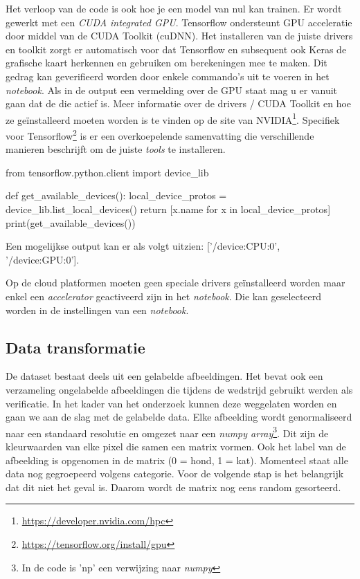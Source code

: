 Het verloop van de code is ook hoe je een model van nul kan trainen. Er wordt gewerkt met een \textit{CUDA integrated GPU}. Tensorflow ondersteunt GPU acceleratie door middel van de CUDA Toolkit (cuDNN). Het installeren van de juiste drivers en toolkit zorgt er automatisch voor dat Tensorflow en subsequent ook Keras de grafische kaart herkennen en gebruiken om berekeningen mee te maken. Dit gedrag kan geverifieerd worden door enkele commando's uit te voeren in het \textit{notebook}. Als in de output een vermelding over de GPU staat mag u er vanuit gaan dat de die actief is. Meer informatie over de drivers / CUDA Toolkit en hoe ze geïnstalleerd moeten worden is te vinden op de site van NVIDIA\footnote{\url{https://developer.nvidia.com/hpc}}. Specifiek voor Tensorflow\footnote{\url{https://tensorflow.org/install/gpu}} is er een overkoepelende samenvatting die verschillende manieren beschrijft om de juiste \textit{tools} te installeren.

\bigskip

\begin{python}
from tensorflow.python.client import device_lib

def get_available_devices():
    local_device_protos = device_lib.list_local_devices()
    return [x.name for x in local_device_protos]
print(get_available_devices()) 
\end{python}

Een mogelijkse output kan er als volgt uitzien: ['/device:CPU:0', '/device:GPU:0'].

Op de cloud platformen moeten geen speciale drivers geïnstalleerd worden maar enkel een \textit{accelerator} geactiveerd zijn in het \textit{notebook}. Die kan geselecteerd worden in de instellingen van een \textit{notebook}.

\subsection{Data transformatie}
\label{subsec:autokeras-tranform}

De dataset bestaat deels uit een gelabelde afbeeldingen. Het bevat ook een verzameling ongelabelde afbeeldingen die tijdens de wedstrijd gebruikt werden als verificatie. In het kader van het onderzoek kunnen deze weggelaten worden en gaan we aan de slag met de gelabelde data. Elke afbeelding wordt genormaliseerd naar een standaard resolutie en omgezet naar een \textit{numpy array}\footnote{In de code is 'np' een verwijzing naar \textit{numpy}}. Dit zijn de kleurwaarden van elke pixel die samen een matrix vormen. Ook het label van de afbeelding is opgenomen in de matrix (0 = hond, 1 = kat). Momenteel staat alle data nog gegroepeerd volgens categorie. Voor de volgende stap is het belangrijk dat dit niet het geval is. Daarom wordt de matrix nog eens random gesorteerd.

